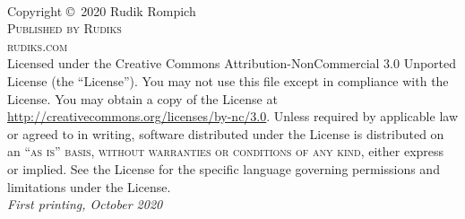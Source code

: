 \documentclass[11pt,fleqn]{book} %
\begin{document}

\newpage
~\vfill
\thispagestyle{empty}

\noindent Copyright \copyright\ 2020 Rudik Rompich\\ %

\noindent \textsc{Published by Rudiks}\\ %

\noindent \textsc{rudiks.com}\\ %

\noindent Licensed under the Creative Commons Attribution-NonCommercial 3.0 Unported License (the ``License''). You may not use this file except in compliance with the License. You may obtain a copy of the License at \url{http://creativecommons.org/licenses/by-nc/3.0}. Unless required by applicable law or agreed to in writing, software distributed under the License is distributed on an \textsc{``as is'' basis, without warranties or conditions of any kind}, either express or implied. See the License for the specific language governing permissions and limitations under the License.\\ %

\noindent \textit{First printing, October 2020} %




\pagestyle{empty} %

\tableofcontents %

\cleardoublepage %

\pagestyle{fancy} %

\end{document}
